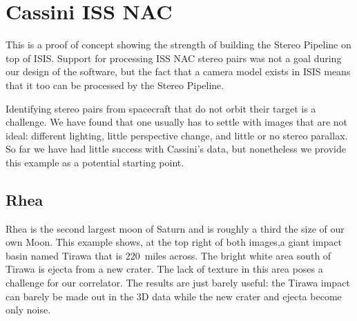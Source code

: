 \clearpage

\section{Cassini ISS NAC}

This is a proof of concept showing the strength of building the Stereo
Pipeline on top of \ac{ISIS}.  Support for processing ISS NAC stereo pairs
was not a goal during our design of the software, but the fact that a
camera model exists in \ac{ISIS} means that it too can be processed by the
Stereo Pipeline.

Identifying stereo pairs from spacecraft that do not orbit their
target is a challenge. We have found that one usually has to settle
with images that are not ideal: different lighting, little perspective
change, and little or no stereo parallax. So far we have had little
success with Cassini's data, but nonetheless we provide this example
as a potential starting point.

\subsection{Rhea}

Rhea is the second largest moon of Saturn and is roughly a third the
size of our own Moon. This example shows, at the top right of both
images,a giant impact basin named Tirawa that is 220~miles across. The
bright white area south of Tirawa is ejecta from a new crater.  The
lack of texture in this area poses a challenge for our correlator. The
results are just barely useful: the Tirawa impact can barely be made
out in the 3D data while the new crater and ejecta become only noise.

